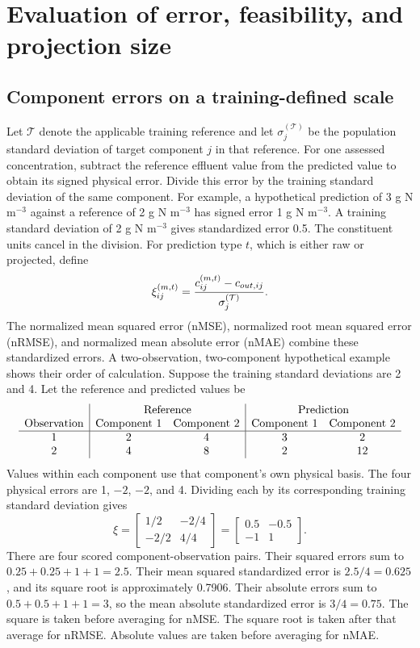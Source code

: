 \section{Evaluation of error, feasibility, and projection size}

\subsection{Component errors on a training-defined scale}

Let $\mathcal{T}$ denote the applicable training reference and let $\sigma_j^{(\mathcal{T})}$ be the population standard deviation of target component $j$ in that reference. For one assessed concentration, subtract the reference effluent value from the predicted value to obtain its signed physical error. Divide this error by the training standard deviation of the same component. For example, a hypothetical prediction of 3 g N m$^{-3}$ against a reference of 2 g N m$^{-3}$ has signed error 1 g N m$^{-3}$. A training standard deviation of 2 g N m$^{-3}$ gives standardized error 0.5. The constituent units cancel in the division. For prediction type $t$, which is either raw or projected, define
\begin{equation}
\equationname{Component error standardized by the training response scale}
\xi_{ij}^{(m,t)}=
\frac{c_{ij}^{(m,t)}-c_{out,ij}}{\sigma_j^{(\mathcal{T})}}.
\label{eq:projection_standardized_error}
\end{equation}
The normalized mean squared error (nMSE), normalized root mean squared error (nRMSE), and normalized mean absolute error (nMAE) combine these standardized errors. A two-observation, two-component hypothetical example shows their order of calculation. Suppose the training standard deviations are 2 and 4. Let the reference and predicted values be
\[
\begin{array}{c|cc|cc}
&\multicolumn{2}{c|}{\text{Reference}}&\multicolumn{2}{c}{\text{Prediction}}\\
\text{Observation}&\text{Component 1}&\text{Component 2}&\text{Component 1}&\text{Component 2}\\\hline
1&2&4&3&2\\
2&4&8&2&12
\end{array}
\]
Values within each component use that component's own physical basis. The four physical errors are 1, $-2$, $-2$, and 4. Dividing each by its corresponding training standard deviation gives
\[
\xi=\begin{bmatrix}1/2&-2/4\\-2/2&4/4\end{bmatrix}
=\begin{bmatrix}0.5&-0.5\\-1&1\end{bmatrix}.
\]
There are four scored component-observation pairs. Their squared errors sum to $0.25+0.25+1+1=2.5$. Their mean squared standardized error is $2.5/4=0.625$, and its square root is approximately 0.7906. Their absolute errors sum to $0.5+0.5+1+1=3$, so the mean absolute standardized error is $3/4=0.75$. The square is taken before averaging for nMSE. The square root is taken after that average for nRMSE. Absolute values are taken before averaging for nMAE.


